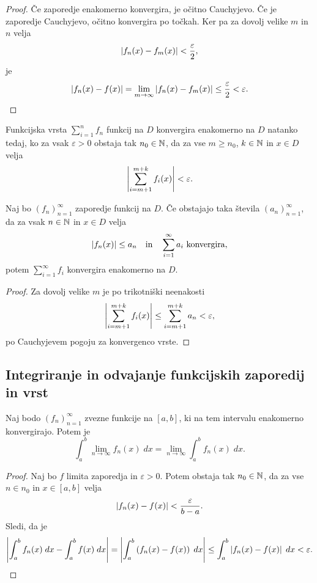 \documentclass[12pt, a4paper]{article}
\begin{document}
\begin{proof}
Če zaporedje enakomerno konvergira, je očitno Cauchyjevo. Če je zaporedje Cauchyjevo, očitno konvergira po točkah. Ker pa za dovolj velike $m$ in $n$ velja
\[
\left\lvert f_n(x)-f_m(x)\right\rvert<\frac{\varepsilon}{2},
\]
je
\[
\left\lvert f_n(x)-f(x)\right\rvert=\lim_{m\to\infty}\left\lvert f_n(x)-f_m(x)\right\rvert\leq\frac{\varepsilon}{2}<\varepsilon.\qedhere
\]
\end{proof}

\begin{posledica}
Funkcijska vrsta $\displaystyle\sum_{i=1}^n f_n$ funkcij na $D$ konvergira enakomerno na $D$ natanko tedaj, ko za vsak $\varepsilon>0$ obstaja tak $n_0\in\mathbb{N}$, da za vse $m\geq n_0$, $k\in\mathbb{N}$ in $x\in D$ velja
\[
\left\lvert \sum_{i=m+1}^{m+k} f_i(x)\right\rvert<\varepsilon.
\]
\end{posledica}

\begin{izrek}
Naj bo $(f_n)_{n=1}^\infty$ zaporedje funkcij na $D$. Če obstajajo taka števila $(a_n)_{n=1}^\infty$, da za vsak $n\in\mathbb{N}$ in $x\in D$ velja
\[
\left\lvert f_n(x)\right\rvert\leq a_n\quad\text{in}\quad\sum_{i=1}^\infty a_i~\text{konvergira},
\]
potem $\displaystyle\sum_{i=1}^\infty f_i$ konvergira enakomerno na $D$.
\end{izrek}

\begin{proof}
Za dovolj velike $m$ je po trikotniški neenakosti
\[
\left\lvert \sum_{i=m+1}^{m+k} f_i(x)\right\rvert\leq\sum_{i=m+1}^{m+k} a_n<\varepsilon,
\]
po Cauchyjevem pogoju za konvergenco vrste.
\end{proof}

\newpage

\subsection{Integriranje in odvajanje funkcijskih zaporedij in vrst}

\begin{izrek}
Naj bodo $(f_n)_{n=1}^\infty$ zvezne funkcije na $[a,b]$, ki na tem intervalu enakomerno konvergirajo. Potem je
\[
\int_a^b \lim_{n\to\infty} f_n(x)\;dx=\lim_{n\to\infty}\int_a^b f_n(x)\;dx.
\]
\end{izrek}

\begin{proof}
Naj bo $f$ limita zaporedja in $\varepsilon>0$. Potem obstaja tak $n_0\in\mathbb{N}$, da za vse $n\in n_0$ in $x\in [a,b]$ velja
\[
\left\lvert f_n(x)-f(x)\right\rvert<\frac{\varepsilon}{b-a}.
\]
Sledi, da je
\[
\left\lvert \int_a^b f_n(x)\;dx-\int_a^b f(x)\;dx\right\rvert=\left\lvert \int_a^b \left(f_n(x)-f(x)\right)\;dx\right\rvert\leq\int_a^b \left\lvert f_n(x)-f(x)\right\rvert\;dx<\varepsilon.\qedhere
\]
\end{proof}
\end{document}
